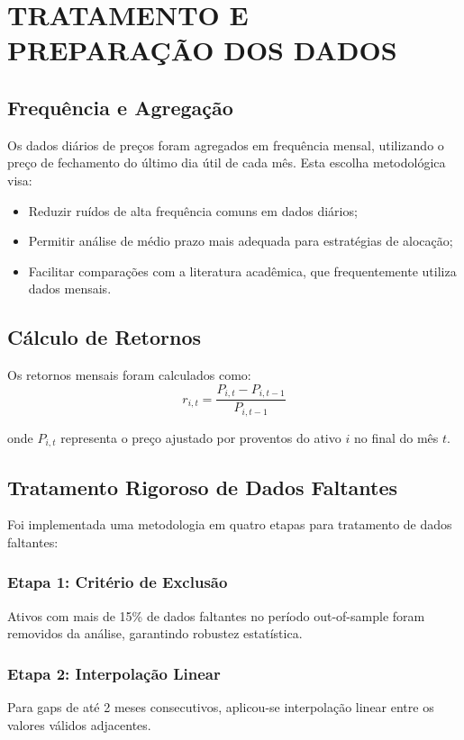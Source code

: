 \section{TRATAMENTO E PREPARAÇÃO DOS DADOS}

\subsection{Frequência e Agregação}

Os dados diários de preços foram agregados em frequência mensal, utilizando o preço de fechamento do último dia útil de cada mês. Esta escolha metodológica visa:
\begin{itemize}
    \item Reduzir ruídos de alta frequência comuns em dados diários;
    \item Permitir análise de médio prazo mais adequada para estratégias de alocação;
    \item Facilitar comparações com a literatura acadêmica, que frequentemente utiliza dados mensais.
\end{itemize}

\subsection{Cálculo de Retornos}

Os retornos mensais foram calculados como:
$$r_{i,t} = \frac{P_{i,t} - P_{i,t-1}}{P_{i,t-1}}$$

onde $P_{i,t}$ representa o preço ajustado por proventos do ativo $i$ no final do mês $t$.

\subsection{Tratamento Rigoroso de Dados Faltantes}

Foi implementada uma metodologia em quatro etapas para tratamento de dados faltantes:

\subsubsection{Etapa 1: Critério de Exclusão}
Ativos com mais de 15\% de dados faltantes no período out-of-sample foram removidos da análise, garantindo robustez estatística.

\subsubsection{Etapa 2: Interpolação Linear}
Para gaps de até 2 meses consecutivos, aplicou-se interpolação linear entre os valores válidos adjacentes.


